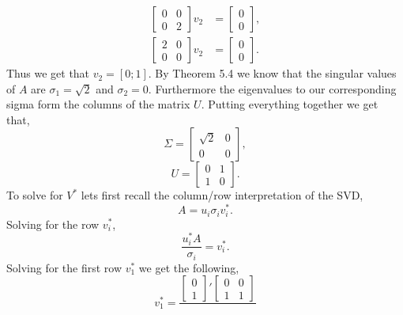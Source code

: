 \documentclass[12pt]{article}
\makeatletter
\theoremstyle{homework}
\newenvironment{exercise}[1]
{\def\@currentlabel{#1}\exercisecore}
{\endexercisecore}
\makeatother
\begin{document}
\begin{exercise}{P10}
\begin{enumerate}
\begin{align*}
\begin{bmatrix}
      0 & 0\\
      0 & 2
    \end{bmatrix}v_2 &= 
    \begin{bmatrix}
      0 \\
      0 
    \end{bmatrix},\\
      \begin{bmatrix}
        2 & 0\\
        0 & 0
      \end{bmatrix}v_2 &= 
      \begin{bmatrix}
        0 \\
        0 
      \end{bmatrix}.
  \end{align*}
Thus we get that $v_2 = [0;1]$. By Theorem 5.4 we know that the singular values of 
$A$ are $\sigma_1 = \sqrt{2}$ and $\sigma_2 = 0$. Furthermore the eigenvalues to our corresponding
sigma form the columns of the matrix $U$. Putting everything together we get that,
  \begin{equation*}
    \Sigma = 
    \begin{bmatrix}
      \sqrt{2} & 0\\
      0 & 0
    \end{bmatrix},
  \end{equation*}
  \begin{equation*}
    U = 
    \begin{bmatrix}
      0 & 1\\
      1 & 0
    \end{bmatrix}.
  \end{equation*}
  To solve for $V^*$ lets first recall the column/row interpretation of the SVD, 
  \begin{equation*}
    A = u_i \sigma_i v^*_i.
  \end{equation*}
  Solving for the row $v^*_i$,
  \begin{equation*}
   \dfrac{u^*_iA}{\sigma_i} = v^*_i. 
  \end{equation*}
  Solving for the first row $v^*_1$ we get the following, 
  \begin{equation*}
    v^*_1 = \dfrac{
      \begin{bmatrix}
        0 \\
        1 
      \end{bmatrix}'
      \begin{bmatrix}
        0 & 0\\
        1 & 1
      \end{bmatrix}}{
}
\end{equation*}
\end{enumerate}
\end{exercise}
\end{document}
